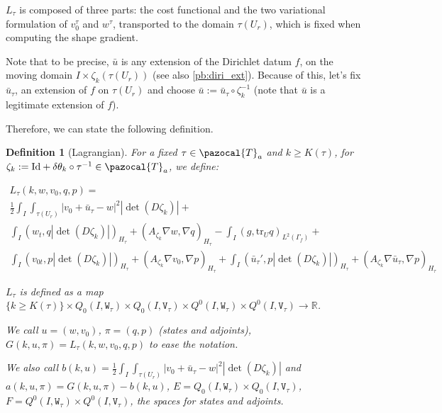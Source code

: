 \documentclass[english,a4paper,9pt,oneside]{scrbook}	%
\theoremstyle{break}
\newtheorem{defn}[equation]{Definition}
\theoremstyle{remark}
\newcommand{\mR}{\mathbb{R}}
\newcommand{\tr}{\text{tr}}
\newcommand{\cT}{\pazocal{T}}
\newcommand{\id}{\text{Id}}
\newcommand{\te}{\theta}
\newcommand{\tw}[1]{\texttt{#1}}
\begin{document}
$L_\tau$ is composed of three parts: the cost functional and the two variational formulation of $v_0^\tau$ and $w^\tau$, transported to the domain $\tau(U_r)$, which is fixed when computing the shape gradient.

Note that to be precise, $\bar{u}$ is any extension of the Dirichlet datum $f$, on the moving domain $I \times \zeta_k(\tau(U_r))$ (see also \cref{pb:diri_ext}). Because of this, let's fix $\bar{u}_\tau$, an extension of $f$ on $\tau(U_r)$ and choose $\bar{u}:=\bar{u}_\tau\circ \zeta_k^{-1}$ (note that $\bar{u}$ is a legitimate extension of $f$). 



Therefore, we can state the following definition.

\begin{defn}[Lagrangian]

For a fixed $\tau \in \cT_a$ and  $k\geq K(\tau)$, for $\zeta_k:=\id+\delta\te_k \circ \tau^{-1} \in \cT_a$, we define:

\begin{align*}
L_\tau(k,w,v_0,q,p) = \\
\frac{1}{2}\int_I \int_{\tau(U_r)}|v_0+\bar{u}_\tau - w|^2|\det(D\zeta_k)|+\\
\int_I ( w_t , q |\det(D\zeta_k)|)_{H_\tau}+ (A_{\zeta_k}\nabla w, \nabla q)_{H_\tau} -\int_I(g,\tr_{U} q)_{L^2(\Gamma_f)} +\\ \int_I (v_{0t},p |\det(D\zeta_k)|)_{H_\tau} + (A_{\zeta_k} \nabla v_0, \nabla p)_{H_\tau}+\int_I(\bar{u}_\tau',p|\det(D\zeta_k)|)_{H_\tau}+(A_{\zeta_k} \nabla \bar{u}_\tau , \nabla p)_{H_\tau}
\end{align*}

$L_\tau$ is defined as a map $\{k\geq K(\tau)\}\times Q_0(I, \tw{W}_\tau)\times Q_0(I,\tw{V}_\tau)\times Q^0(I, \tw{W}_\tau)\times Q^0(I, \tw{V}_\tau)\rightarrow \mR$.

We call $u = (w,v_0)$, $\pi = (q,p)$ (states and adjoints), $G(k,u,\pi) = L_\tau(k,w,v_0,q,p)$ to ease the notation.

We also call $b(k, u) = \frac{1}{2}\int_I \int_{\tau(U_r)}|v_0+\bar{u}_\tau - w|^2|\det(D\zeta_k)|$ and $a(k, u,\pi) = G(k,u,\pi)-b(k, u)$, $E = Q_0(I, \tw{W}_\tau)\times Q_0(I,\tw{V}_\tau)$, $F=Q^0(I, \tw{W}_\tau)\times Q^0(I, \tw{V}_\tau)$, the spaces for states and adjoints.

\end{defn}
\end{document}
